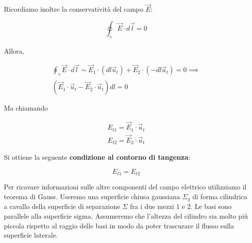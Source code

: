 \begin{figure}[htpb]
\end{figure}
\FloatBarrier

Ricordiamo inoltre la conservatività del campo $\vec{E}$:

\[
	\oint_{\gamma} \vec{E} \cdot d\vec{l} = 0
\]

Allora,

\begin{gather*}
	\oint_{\gamma} \vec{E} \cdot d\vec{l} \sim \vec{E}_1 \cdot (dl\vec{u}_t)+\vec{E}_2\cdot (-dl\vec{u}_t)=0 \implies \\
	(\vec{E}_1\cdot \vec{u}_t-\vec{E}_2\cdot \vec{u}_t)dl=0
\end{gather*}

Ma chiamando

\begin{gather*}
	E_{t1}= \vec{E}_1\cdot \vec{u}_t \\
	E_{t2}= \vec{E}_2\cdot \vec{u}_t
\end{gather*}

Si ottiene la seguente \textbf{condizione al contorno di tangenza}:

\[
	\boxed{E_{t1}=E_{t2}}
\]

Per ricavare informazioni sulle altre componenti del campo elettrico utilizziamo il teorema di Gauss. Useremo una superficie chiusa gaussiana $\Sigma_g$ di forma cilindrica a cavallo della superficie di separazione $\Sigma$ fra i due mezzi $1$ e $2$. Le basi sono parallele alla superficie sigma. Assumeremo che l'altezza del cilindro sia molto più piccola rispetto al raggio delle basi in modo da poter trascurare il flusso sulla superficie laterale.

